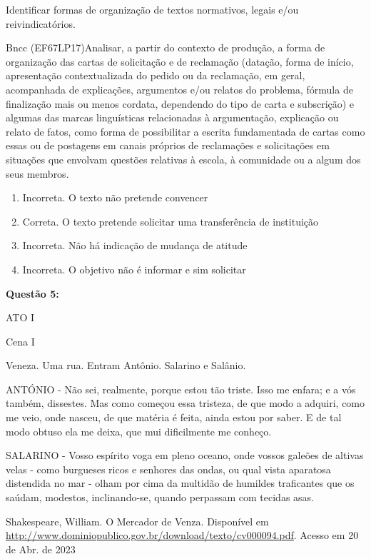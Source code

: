 {Identificar formas de organização de textos normativos, legais e/ou
reivindicatórios.

Bncc (EF67LP17)Analisar, a partir do contexto de produção, a forma de
organização das cartas de solicitação e de reclamação (datação, forma de
início, apresentação contextualizada do pedido ou da reclamação, em
geral, acompanhada de explicações, argumentos e/ou relatos do problema,
fórmula de finalização mais ou menos cordata, dependendo do tipo de
carta e subscrição) e algumas das marcas linguísticas relacionadas à
argumentação, explicação ou relato de fatos, como forma de possibilitar
a escrita fundamentada de cartas como essas ou de postagens em canais
próprios de reclamações e solicitações em situações que envolvam
questões relativas à escola, à comunidade ou a algum dos seus membros.

\begin{enumerate}
\def\labelenumi{\arabic{enumi}.}
\item
  Incorreta. O texto não pretende convencer
\item
  Correta. O texto pretende solicitar uma transferência de instituição
\item
  Incorreta. Não há indicação de mudança de atitude
\item
  Incorreta. O objetivo não é informar e sim solicitar
\end{enumerate}

\textbf{Questão 5:}

ATO I

Cena I

Veneza. Uma rua. Entram Antônio. Salarino e Salânio.

ANTÓNIO - Não sei, realmente, porque estou tão triste. Isso me enfara; e
a vós também, dissestes. Mas como começou essa tristeza, de que modo a
adquiri, como me veio, onde nasceu, de que matéria é feita, ainda estou
por saber. E de tal modo obtuso ela me deixa, que mui dificilmente me
conheço.

SALARINO - Vosso espírito voga em pleno oceano, onde vossos galeões de
altivas velas - como burgueses ricos e senhores das ondas, ou qual vista
aparatosa distendida no mar - olham por cima da multidão de humildes
traficantes que os saúdam, modestos, inclinando-se, quando perpassam com
tecidas asas.

Shakespeare, William. O Mercador de Venza. Disponível em
\href{http://www.dominiopublico.gov.br/download/texto/cv000094.pdf}{\uline{http://www.dominiopublico.gov.br/download/texto/cv000094.pdf}}.
Acesso em 20 de Abr. de 2023

}
